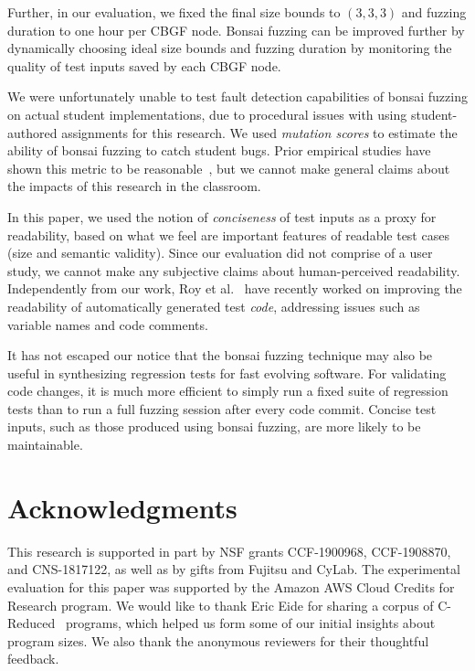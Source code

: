 \documentclass[conference]{IEEEtran}
\newcommand{\tech}{bonsai fuzzing} \newcommand{\Tech}{Bonsai fuzzing} \newcommand{\TECH}{Bonsai Fuzzing}
\begin{document}
Further, in our evaluation, we fixed the final size bounds to $(3,3,3)$ and fuzzing duration to one hour per CBGF node. \Tech{} can be improved further by dynamically choosing ideal size bounds and fuzzing duration by monitoring the quality of test inputs saved by each CBGF node.

We were unfortunately unable to test fault detection capabilities of \tech{} on actual student implementations, due to procedural issues with using student-authored assignments for this research. We used \emph{mutation scores} to estimate the ability of \tech{} to catch student bugs. Prior empirical studies have shown this metric to be reasonable~\cite{Just14}, but we cannot make general claims about the impacts of this research in the classroom.

In this paper, we used the notion of \emph{conciseness} of test inputs as a proxy for {readability}, based on what we feel are important features of readable test cases (size and semantic validity). Since our evaluation did not comprise of a user study, we cannot make any subjective claims about human-perceived readability. 
Independently from our work, Roy et al.~\cite{Roy20} have recently worked on improving the readability of automatically generated test \emph{code}, addressing issues such as variable names and code comments.

It has not escaped our notice that the \tech{} technique may also be useful in synthesizing regression tests for fast evolving software. For validating code changes, it is much more efficient to simply run a fixed suite of regression tests than to run a full fuzzing session after every code commit. Concise test inputs, such as those produced using \tech{}, are more likely to be maintainable.



\section*{Acknowledgments}

This research is supported in part by NSF grants CCF-1900968, CCF-1908870, and CNS-1817122, as well as by gifts from Fujitsu and CyLab. The experimental evaluation for this paper was supported by the Amazon AWS Cloud Credits for Research program. We would like to thank Eric Eide for sharing a corpus of C-Reduced~\cite{Regehr12} programs, which helped us form some of our initial insights about program sizes. We also thank the anonymous reviewers for their thoughtful feedback.  



 









\balance
\end{document}
